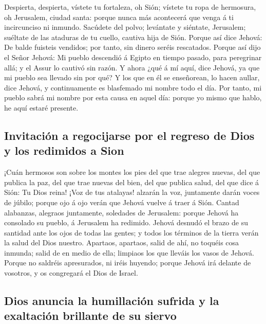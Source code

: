  Despierta, despierta, vístete tu fortaleza, oh Sión;
vístete tu ropa de hermosura, oh Jerusalem, ciudad santa: porque nunca
más acontecerá que venga á ti incircunciso ni inmundo. 
Sacúdete del polvo; levántate y siéntate, Jerusalem; suéltate de las
ataduras de tu cuello, cautiva hija de Sión.  Porque así
dice Jehová: De balde fuisteis vendidos; por tanto, sin dinero seréis
rescatados.  Porque así dijo el Señor Jehová: Mi pueblo
descendió á Egipto en tiempo pasado, para peregrinar allá; y el Assur lo
cautivó sin razón.  Y ahora ¿qué á mí aquí, dice Jehová,
ya que mi pueblo sea llevado sin por qué? Y los que en él se enseñorean,
lo hacen aullar, dice Jehová, y continuamente es blasfemado mi nombre
todo el día.  Por tanto, mi pueblo sabrá mi nombre por
esta causa en aquel día: porque yo mismo que hablo, he aquí estaré
presente.

\hypertarget{invitaciuxf3n-a-regocijarse-por-el-regreso-de-dios-y-los-redimidos-a-sion}{%
\subsection{Invitación a regocijarse por el regreso de Dios y los
redimidos a
Sion}\label{invitaciuxf3n-a-regocijarse-por-el-regreso-de-dios-y-los-redimidos-a-sion}}

 ¡Cuán hermosos son sobre los montes los pies del que trae
alegres nuevas, del que publica la paz, del que trae nuevas del bien,
del que publica salud, del que dice á Sión: Tu Dios reina!
 ¡Voz de tus atalayas! alzarán la voz, juntamente darán
voces de júbilo; porque ojo á ojo verán que Jehová vuelve á traer á
Sión.  Cantad alabanzas, alegraos juntamente, soledades de
Jerusalem: porque Jehová ha consolado su pueblo, á Jerusalem ha
redimido.  Jehová desnudó el brazo de su santidad ante
los ojos de todas las gentes; y todos los términos de la tierra verán la
salud del Dios nuestro.  Apartaos, apartaos, salid de
ahí, no toquéis cosa inmunda; salid de en medio de ella; limpiaos los
que lleváis los vasos de Jehová.  Porque no saldréis
apresurados, ni iréis huyendo; porque Jehová irá delante de vosotros, y
os congregará el Dios de Israel.

\hypertarget{dios-anuncia-la-humillaciuxf3n-sufrida-y-la-exaltaciuxf3n-brillante-de-su-siervo}{%
\subsection{Dios anuncia la humillación sufrida y la exaltación
brillante de su
siervo}\label{dios-anuncia-la-humillaciuxf3n-sufrida-y-la-exaltaciuxf3n-brillante-de-su-siervo}}

